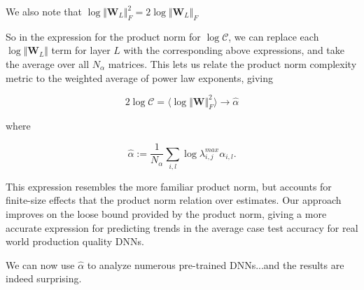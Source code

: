 We also note that $\log\Vert\mathbf{W}_{L}\Vert^{2}_{F}=2\log\Vert\mathbf{W}_{L}\Vert_{F}$ 

So in the expression for the product norm for $\log\mathcal{C}$, we can replace each $\log\Vert\mathbf{W}_{L}\Vert$ term for layer $L$ with the corresponding above expressions, and take the average over all $N_{\alpha}$  matrices.  This lets us relate the product norm complexity metric to the weighted average of power law exponents, giving

$$2\log\mathcal{C}=\langle\log\Vert\mathbf{W}\Vert^{2}_{F}\rangle\rightarrow\hat{\alpha}$$ 

where

\begin{equation}
\hat{\alpha}:=\dfrac{1}{N_{\alpha}}\sum_{i,l}\log\lambda^{max}_{i,j}\alpha_{i,l}  .
\label{eqn:alpha_hat_specific}
\end{equation}

This expression resembles the more familiar product norm, but accounts for finite-size effects that the product norm relation over estimates.
Our approach improves on the loose bound provided by the product norm, giving a more accurate expression for predicting trends
in the average case test accuracy for real world production quality DNNs.

We can now use $\hat{\alpha}$ to analyze numerous pre-trained DNNs...and the results are indeed surprising.


